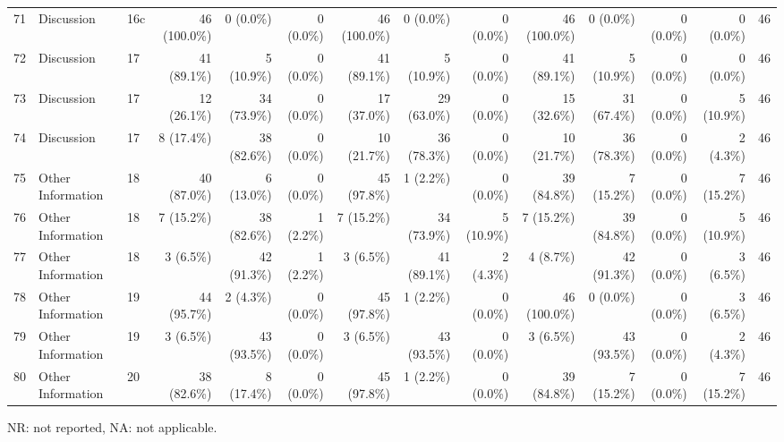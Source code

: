 \begin{longtable}{@{}rll*{11}{r}@{}}
71 & Discussion & 16c & 46 (100.0\%) & 0 (0.0\%) & 0 (0.0\%) & 46 (100.0\%) & 0 (0.0\%) & 0 (0.0\%) & 46 (100.0\%) & 0 (0.0\%) & 0 (0.0\%) & 0 (0.0\%) & 46 \\
72 & Discussion & 17 & 41 (89.1\%) & 5 (10.9\%) & 0 (0.0\%) & 41 (89.1\%) & 5 (10.9\%) & 0 (0.0\%) & 41 (89.1\%) & 5 (10.9\%) & 0 (0.0\%) & 0 (0.0\%) & 46 \\
73 & Discussion & 17 & 12 (26.1\%) & 34 (73.9\%) & 0 (0.0\%) & 17 (37.0\%) & 29 (63.0\%) & 0 (0.0\%) & 15 (32.6\%) & 31 (67.4\%) & 0 (0.0\%) & 5 (10.9\%) & 46 \\
74 & Discussion & 17 & 8 (17.4\%) & 38 (82.6\%) & 0 (0.0\%) & 10 (21.7\%) & 36 (78.3\%) & 0 (0.0\%) & 10 (21.7\%) & 36 (78.3\%) & 0 (0.0\%) & 2 (4.3\%) & 46 \\
75 & Other Information & 18 & 40 (87.0\%) & 6 (13.0\%) & 0 (0.0\%) & 45 (97.8\%) & 1 (2.2\%) & 0 (0.0\%) & 39 (84.8\%) & 7 (15.2\%) & 0 (0.0\%) & 7 (15.2\%) & 46 \\
76 & Other Information & 18 & 7 (15.2\%) & 38 (82.6\%) & 1 (2.2\%) & 7 (15.2\%) & 34 (73.9\%) & 5 (10.9\%) & 7 (15.2\%) & 39 (84.8\%) & 0 (0.0\%) & 5 (10.9\%) & 46 \\
77 & Other Information & 18 & 3 (6.5\%) & 42 (91.3\%) & 1 (2.2\%) & 3 (6.5\%) & 41 (89.1\%) & 2 (4.3\%) & 4 (8.7\%) & 42 (91.3\%) & 0 (0.0\%) & 3 (6.5\%) & 46 \\
78 & Other Information & 19 & 44 (95.7\%) & 2 (4.3\%) & 0 (0.0\%) & 45 (97.8\%) & 1 (2.2\%) & 0 (0.0\%) & 46 (100.0\%) & 0 (0.0\%) & 0 (0.0\%) & 3 (6.5\%) & 46 \\
79 & Other Information & 19 & 3 (6.5\%) & 43 (93.5\%) & 0 (0.0\%) & 3 (6.5\%) & 43 (93.5\%) & 0 (0.0\%) & 3 (6.5\%) & 43 (93.5\%) & 0 (0.0\%) & 2 (4.3\%) & 46 \\
80 & Other Information & 20 & 38 (82.6\%) & 8 (17.4\%) & 0 (0.0\%) & 45 (97.8\%) & 1 (2.2\%) & 0 (0.0\%) & 39 (84.8\%) & 7 (15.2\%) & 0 (0.0\%) & 7 (15.2\%) & 46 \\

\end{longtable}
\par\smallskip
\parbox{\linewidth}{\footnotesize NR: not reported, NA: not applicable.}
\endgroup

